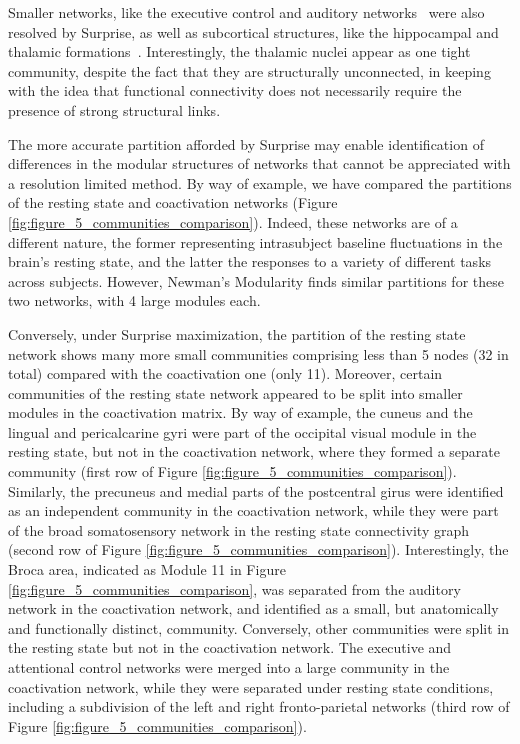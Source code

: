 Smaller networks, like the executive control and auditory networks~\cite{salvador2005,vandenheuvel2010} were also resolved by Surprise, as well as subcortical structures, like the hippocampal and thalamic formations~\cite{roy2009,chen2013}. Interestingly, the thalamic nuclei appear as one tight community, despite the fact that they are structurally unconnected, in keeping with the idea that functional connectivity does not necessarily require the presence of strong structural links.

The more accurate partition afforded by Surprise may enable identification of differences in the modular structures of networks that cannot be appreciated with a resolution limited method. By way of example, we have compared the partitions of the resting state and coactivation networks (Figure \ref{fig:figure_5_communities_comparison}). Indeed, these networks are of a different nature, the former representing intrasubject baseline fluctuations in the brain's resting state, and the latter the responses to a variety of different tasks across subjects. However, Newman's Modularity finds similar partitions for these two networks, with 4 large modules each.

Conversely, under Surprise maximization, the partition of the resting state network shows many more small communities comprising less than 5 nodes (32 in total) compared with the coactivation one (only 11). Moreover, certain communities of the resting state network appeared to be split into smaller modules in the coactivation matrix. 
By way of example, the cuneus and the lingual and pericalcarine gyri were part of the occipital visual module in the resting state, but not in the coactivation network, where they formed a separate community (first row of Figure \ref{fig:figure_5_communities_comparison}).
Similarly, the precuneus and medial parts of the postcentral girus were identified as an independent community in the coactivation network, while they were part of the broad somatosensory network in the resting state connectivity graph~\cite{rubinov2011} (second row of Figure \ref{fig:figure_5_communities_comparison}).
Interestingly, the Broca area, indicated as Module 11 in Figure \ref{fig:figure_5_communities_comparison}, was separated from the auditory network in the coactivation network, and identified as a small, but anatomically and functionally distinct, community.
Conversely, other communities were split in the resting state but not in the coactivation network. The executive and attentional control networks were merged into a large community in the coactivation network, while they were separated under resting state conditions, including a subdivision of the left and right fronto-parietal networks (third row of Figure \ref{fig:figure_5_communities_comparison}).

